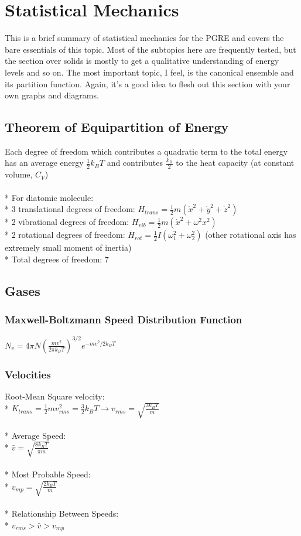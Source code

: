 \section{Statistical Mechanics}
This is a brief summary of statistical mechanics for the PGRE and covers the bare essentials of this topic.
Most of the subtopics here are frequently tested, but the section over solids is mostly to get a qualitative understanding of energy levels and so on.
The most important topic, I feel, is the canonical ensemble and its partition function.
Again, it's a good idea to flesh out this section with your own graphs and diagrams.

\subsection{Theorem of Equipartition of Energy}
Each degree of freedom which contributes a quadratic term to the total energy has an average energy \(\frac{1}{2}k_BT\) and contributes \(\frac{k_B}{2}\) to the heat capacity (at constant volume, \(C_V\))\\\\*
For diatomic molecule:\\*
3 translational degrees of freedom: \(H_{trans}=\frac{1}{2}m\left(\dot{x}^2+\dot{y}^2+\dot{z}^2\right)\)\\*
2 vibrational degrees of freedom: \(H_{vib}=\frac{1}{2}m\left(\dot{x}^2+\omega^2x^2\right)\)\\*
2 rotational degrees of freedom: \(H_{rot}=\frac{1}{2}I\left(\omega_1^2+\omega_2^2\right)\) (other rotational axis has extremely small moment of inertia)\\*
Total degrees of freedom: 7

\subsection{Gases}

\subsubsection{Maxwell-Boltzmann Speed Distribution Function}
\(\displaystyle N_v=4\pi N\left(\frac{mv^2}{2\pi k_BT}\right)^{3/2}e^{-mv^2/2k_BT}\)

\subsubsection{Velocities}
Root-Mean Square velocity:\\*
\(\displaystyle K_{trans}=\frac{1}{2}mv_{rms}^2=\frac{3}{2}k_BT\rightarrow v_{rms}=\sqrt{\frac{3k_BT}{m}}\)\\\\*
Average Speed:\\*
\(\displaystyle \bar{v}=\sqrt{\frac{8k_BT}{\pi m}}\)\\\\*
Most Probable Speed:\\*
\(\displaystyle v_{mp}=\sqrt{\frac{2k_BT}{m}}\)\\\\*
Relationship Between Speeds:\\*
\(v_{rms}>\bar{v}>v_{mp}\)

